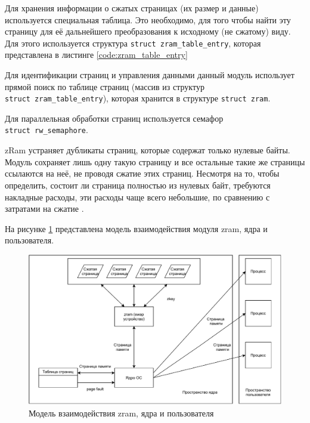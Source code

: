 Для хранения информации о сжатых страницах (их размер и данные) используется специальная таблица. Это необходимо, для того чтобы найти эту страницу для её дальнейшего преобразования к исходному (не сжатому) виду. Для этого используется структура \texttt{struct zram\_table\_entry}, которая представлена в листинге \ref{code:zram_table_entry}


Для идентификации страниц и управления данными данный модуль использует прямой поиск по таблице страниц (массив из структур \\\texttt{struct zram\_table\_entry}), которая хранится в структуре \texttt{struct zram}.

Для параллельная обработки страниц используется семафор \\\texttt{struct rw\_semaphore}.

zRam устраняет дубликаты страниц, которые содержат только нулевые байты. Модуль сохраняет лишь одну такую страницу и все остальные такие же страницы ссылаются на неё, не проводя сжатие этих страниц. Несмотря на то, чтобы определить, состоит ли страница полностью из нулевых байт, требуются накладные расходы, эти расходы чаще всего небольшие, по сравнению с затратами на сжатие \cite{in-kernel-memory-compression}.

На рисунке \ref{fig:zram-kernel} представлена модель взаимодействия модуля zram, ядра и пользователя.

\begin{figure}[h]
	\centering
	\includegraphics[width=\textwidth]{img/zram-kernel.pdf}
	\caption{Модель взаимодействия zram, ядра и пользователя}
	\label{fig:zram-kernel}
\end{figure}


